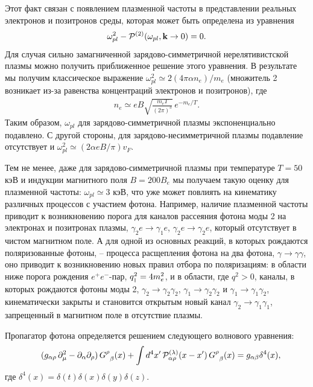 Этот факт связан  с появлением плазменной частоты в представлении реальных электронов и позитронов среды, 
которая может быть определена из уравнения
%
\begin{equation}
\omega_{pl}^2 - {\cal P}^{(2)} (\omega_{pl}, {\mathbf k} \to 0 ) = 0.
\label{eq:omegapl}
\end{equation}
%
Для случая сильно замагниченной зарядово-симметричной нерелятивистской плазмы можно получить приближенное решение этого уравнения. В результате мы получим классическое выражение $\omega_{pl}^2 \simeq 2(4\pi \alpha n_{e})/m_e$ (множитель 2 возникает из-за равенства концентраций электронов и позитронов), где
%
\begin{eqnarray}
n_{e} \simeq eB \sqrt{\frac{m_e T}{(2\pi)^3}}\,e^{-m_e/T}.
\label{eq:ne}
\end{eqnarray}
\noindent Таким образом, $\omega_{pl}$ для зарядово-симметричной плазмы экспоненциально подавлено. С другой стороны, для зарядово-несимметричной плазмы подавление отсутствует и $\omega_{pl}^2 \simeq (2\alpha eB/\pi)v_F$.

Тем не менее, даже для зарядово-симметричной плазмы при температуре $T=50$ кэВ и индукции магнитного поля $B=200 B_e$ мы получаем такую оценку для плазменной частоты: $\omega_{pl} \simeq 3$ кэВ, что уже может повлиять на кинематику различных процессов с участием фотона. Например, наличие плазменной частоты приводит к возникновению порога для каналов рассеяния фотона моды 2 на электронах и позитронах плазмы, $\gamma_2 e \to \gamma_1 e$, $\gamma_2 e \to \gamma_2 e$, который отсутствует в чистом магнитном поле. А для одной из основных реакций, в которых рождаются поляризованные фотоны, -- процесса расщепления фотона на два фотона, $\gamma \to \gamma \gamma$, оно приводит к возникновению новых правил отбора по поляризациям: в области ниже порога рождения $e^+e^-$-пар, $q^2_{\mbox{\tiny $\|$}} = 4 m_e^2$, и в области, где $q^2 > 0$, каналы, в которых рождаются фотоны моды 2, $\gamma_2 \to \gamma_2 \gamma_2$,
$\gamma_1 \to \gamma_2 \gamma_2$ и $\gamma_1 \to \gamma_1 \gamma_2$, кинематически закрыты и становится открытым новый канал $\gamma_2 \to \gamma_1 \gamma_1$, запрещенный в магнитном поле в отсутствие плазмы.

Пропагатор фотона определяется решением следующего волнового уравнения:
\begin{eqnarray}\label{eq:WaveEq}
	\nonumber
	&& 
	(g_{\alpha \rho} \, \partial_{\mu}^2  -
	\partial_{\alpha}\partial_{\rho}) \, G^{\rho}_{\phantom{x}\beta}(x) + 
	\int d^4 x'\, {\cal P}^{(\lambda)}_{\alpha\rho} (x - x') \, 
	G^{\rho}_{\phantom{x}\beta}(x)
	\nonumber= g_{\alpha\beta}\delta^4(x),
	\label{eq:2}
\end{eqnarray}
где $\delta^4(x)=\delta(t)\delta(x)\delta(y)\delta(z)$. 

